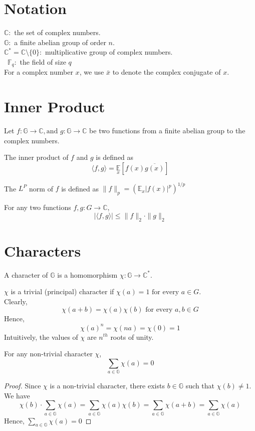 \section{Notation}
$\mathbb{C}:$ the set of complex numbers. \\
$\mathbb{G}:$ a finite abelian group of order $n$.\\
$\mathbb{C}^* = \mathbb{C} \setminus \{0\}:$ multiplicative group of complex numbers. \\\
$\mathbb{F}_q:$ the field of size $q$ \\
For a complex number $x$, we use $\bar{x}$ to denote the complex conjugate of $x$.

\section{Inner Product}
Let $f : \mathbb{G} \rightarrow \mathbb{C}, \text{and } g : \mathbb{G} \rightarrow \mathbb{C}$ be two functions from a finite abelian group to the complex numbers. 
\begin{definition}
The inner product of $f$ and $g$ is defined as 
$$\langle f, g \rangle = \underset {x} {\mathbb{E}} [f(x) \overline{g(x)}] $$
\end{definition}
The $L^P$ norm of $f$ is defined as $\| f \|_{p} = ({\mathbb{E}_x} |f(x)|^p)^{1/p} $

\begin{prop}
For any two functions $f, g : G \rightarrow \mathbb{C}$,
$$| \langle f, g \rangle | \leq \|f \|_2 \cdot \| g \|_2$$
\end{prop}

\section{Characters}
\begin{definition} 
A character of $\mathbb{G}$ is a homomorphism $\chi : \mathbb{G} \rightarrow \mathbb{C}^*$.
\end{definition}
\noindent $\chi$ is a trivial (principal) character if $\chi(a) = 1 \text{ for every } a \in G$. \\
Clearly,
 $$\chi(a+b) = \chi(a) \chi(b) \text{ for every } a,b \in G $$
Hence,
$$\chi(a)^n = \chi(na) = \chi(0) = 1$$
Intuitively, the values of $\chi$ are $n^{th}$ roots of unity.
\begin{prop}
For any non-trivial character $\chi$, 
$$\sum\limits_{a \in \mathbb{G}} \chi(a) = 0$$
\end{prop}
\begin{proof}
Since $\chi$ is a non-trivial character, there exists $b \in \mathbb{G}$ such that $\chi(b) \neq 1$. We have
$$\chi(b) \cdot \sum\limits_{a \in \mathbb{G}} \chi(a)
= \sum\limits_{a \in \mathbb{G}} \chi(a) \chi(b)
= \sum\limits_{a \in \mathbb{G}} \chi(a + b)
= \sum\limits_{a \in \mathbb{G}} \chi(a)$$
Hence, $\sum\limits_{a \in \mathbb{G}} \chi(a) = 0$
\end{proof}

